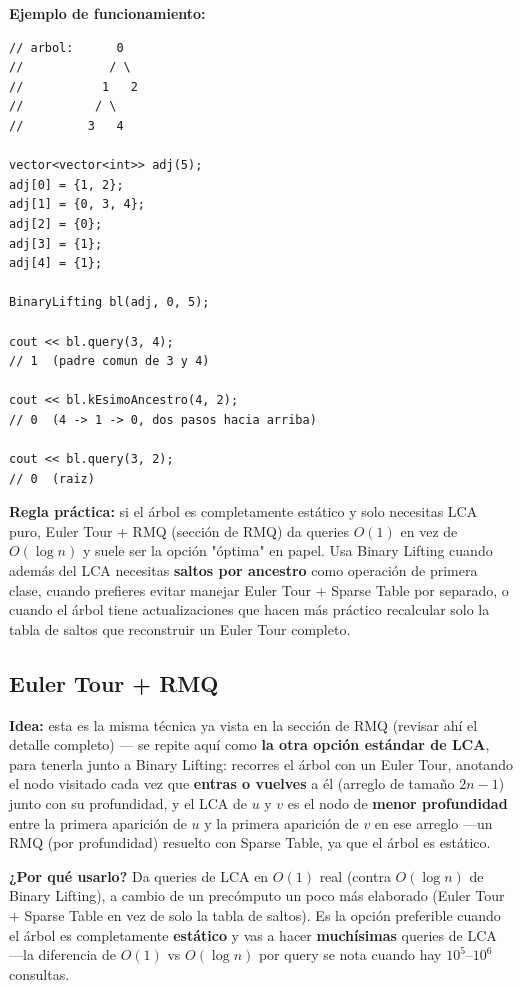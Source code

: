 \documentclass[10pt,a4paper,twocolumn]{article}
\begin{document}
\textbf{Ejemplo de funcionamiento:}

\begin{lstlisting}[style=cpp]
// arbol:      0
//            / \
//           1   2
//          / \
//         3   4

vector<vector<int>> adj(5);
adj[0] = {1, 2};
adj[1] = {0, 3, 4};
adj[2] = {0};
adj[3] = {1};
adj[4] = {1};

BinaryLifting bl(adj, 0, 5);

cout << bl.query(3, 4);
// 1  (padre comun de 3 y 4)

cout << bl.kEsimoAncestro(4, 2);
// 0  (4 -> 1 -> 0, dos pasos hacia arriba)

cout << bl.query(3, 2);
// 0  (raiz)
\end{lstlisting}

\textbf{Regla práctica:} si el árbol es completamente estático y solo
necesitas LCA puro, Euler Tour + RMQ (sección de RMQ) da queries
$O(1)$ en vez de $O(\log n)$ y suele ser la opción "óptima" en papel.
Usa Binary Lifting cuando además del LCA necesitas \textbf{saltos por
ancestro} como operación de primera clase, cuando prefieres evitar
manejar Euler Tour + Sparse Table por separado, o cuando el árbol
tiene actualizaciones que hacen más práctico recalcular solo la tabla
de saltos que reconstruir un Euler Tour completo.


\subsection{Euler Tour + RMQ}

\textbf{Idea:} esta es la misma técnica ya vista en la sección de
RMQ (revisar ahí el detalle completo) — se repite aquí como
\textbf{la otra opción estándar de LCA}, para tenerla junto a Binary
Lifting: recorres el árbol con un Euler Tour, anotando el nodo
visitado cada vez que \textbf{entras o vuelves} a él (arreglo de
tamaño $2n-1$) junto con su profundidad, y el LCA de $u$ y $v$ es el
nodo de \textbf{menor profundidad} entre la primera aparición de $u$
y la primera aparición de $v$ en ese arreglo —un RMQ (por
profundidad) resuelto con Sparse Table, ya que el árbol es estático.

\textbf{¿Por qué usarlo?} Da queries de LCA en $O(1)$ real (contra
$O(\log n)$ de Binary Lifting), a cambio de un precómputo un poco más
elaborado (Euler Tour + Sparse Table en vez de solo la tabla de
saltos). Es la opción preferible cuando el árbol es completamente
\textbf{estático} y vas a hacer \textbf{muchísimas} queries de LCA
—la diferencia de $O(1)$ vs $O(\log n)$ por query se nota cuando hay
$10^5$–$10^6$ consultas.
\end{document}
